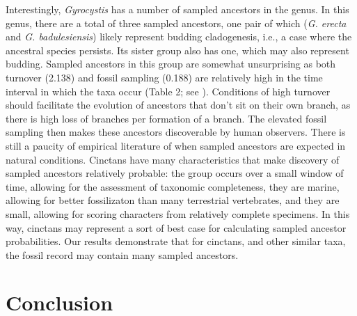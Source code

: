 \documentclass{article}
\begin{document}
Interestingly, \textit{Gyrocystis} has a number of sampled ancestors in the genus. In this genus, there are a total of three sampled ancestors, one pair of which (\textit{G. erecta} and \textit{G. badulesiensis}) likely represent budding cladogenesis, i.e., a case where the ancestral species persists.
Its sister group also has one, which may also represent budding.
Sampled ancestors in this group are somewhat unsurprising as both turnover (2.138) and fossil sampling (0.188) are relatively high in the time interval in which the taxa occur (Table 2; see \citep{Foote1996c}). 
Conditions of high turnover should facilitate the evolution of ancestors that don't sit on their own branch, as there is high loss of branches per formation of a branch.
The elevated fossil sampling then makes these ancestors discoverable by human observers. 
There is still a paucity of empirical literature of when sampled ancestors are expected in natural conditions.
Cinctans have many characteristics that make discovery of sampled ancestors relatively probable: the group occurs over a small window of time, allowing for the assessment of taxonomic completeness, they are marine, allowing for better fossilizaton than many terrestrial vertebrates, and they are small, allowing for scoring characters from relatively complete specimens.
In this way, cinctans may represent a sort of best case for calculating sampled ancestor probabilities.
Our results demonstrate that for cinctans, and other similar taxa, the fossil record may contain many sampled ancestors.

\section{Conclusion}
\end{document}
